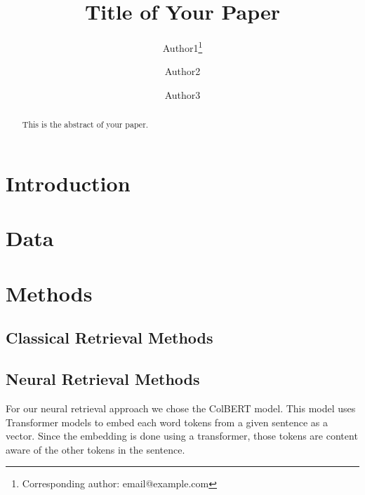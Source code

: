 \documentclass{article}
\title{Title of Your Paper}
\author{Author1\thanks{Corresponding author: email@example.com} \and Author2 \and Author3}
\date{} %
\begin{document}
\maketitle

\begin{abstract}
This is the abstract of your paper.
\end{abstract}


\section{Introduction}

\section{Data}

\section{Methods}
\subsection{Classical Retrieval Methods}

\subsection{Neural Retrieval Methods}

For our neural retrieval approach we chose the ColBERT model. This model uses Transformer models to embed each word tokens from a given sentence as a vector. Since the embedding is done using a transformer, those tokens are content aware of the other tokens in the sentence.
\end{document}
